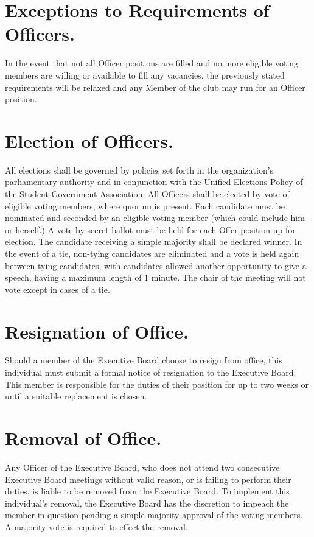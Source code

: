 \documentclass[12pt]{constitution}
\begin{document}
\section{Exceptions to Requirements of Officers.}\label{sec:REQUIREMENTS-OF-OFFICERS-EXCEPTIONS}

In the event that not all Officer positions are filled and no more eligible
voting members are willing or available to fill any vacancies, the previously
stated requirements will be relaxed and any Member of the club may run for an
Officer position.

\section{Election of Officers.}\label{sec:ELECTION-OF-OFFICERS}

All elections shall be governed by policies set forth in the organization’s
parliamentary authority and in conjunction with the Unified Elections Policy of
the Student Government Association. All Officers shall be elected by vote of
eligible voting members, where quorum is present. Each candidate must be
nominated and seconded by an eligible voting member (which could include him--
or herself.) A vote by secret ballot must be held for each Offer position up for
election. The candidate receiving a simple majority shall be declared winner. In
the event of a tie, non-tying candidates are eliminated and a vote is held again
between tying candidates, with candidates allowed another opportunity to give a
speech, having a maximum length of 1 minute. The chair of the meeting will not
vote except in cases of a tie.

\section{Resignation of Office.}\label{sec:RESIGNATION-OF-OFFICE}

Should a member of the Executive Board choose to resign from office, this
individual must submit a formal notice of resignation to the Executive Board.
This member is responsible for the duties of their position for up to two weeks
or until a suitable replacement is chosen.

\section{Removal of Office.}\label{sec:REMOVAL-OF-OFFICE}

Any Officer of the Executive Board, who does not attend two consecutive
Executive Board meetings without valid reason, or is failing to perform their
duties, is liable to be removed from the Executive Board. To implement this
individual's removal, the Executive Board has the discretion to impeach the
member in question pending a simple majority approval of the voting members. A
majority vote is required to effect the removal.
\end{document}
